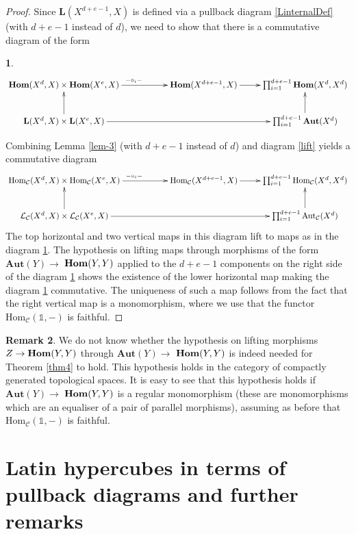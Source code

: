 \documentclass{amsart} %
\theoremstyle{plain}\newtheorem{Theorem}{Theorem}[section]
\theoremstyle{plain}\newtheorem{Conjecture}[Theorem]{Conjecture}
\theoremstyle{plain}\newtheorem{Corollary}[Theorem]{Corollary}
\theoremstyle{plain}\newtheorem{Lemma}[Theorem]{Lemma}
\theoremstyle{plain}\newtheorem{Proposition}[Theorem]{Proposition}
\theoremstyle{definition}\newtheorem{Definition}[Theorem]{Definition}
\theoremstyle{definition}\newtheorem{Example}[Theorem]{Example}
\theoremstyle{definition}\newtheorem{Examples}[Theorem]{Examples}
\theoremstyle{definition}\newtheorem{Remark}[Theorem]{Remark}
\theoremstyle{definition}\newtheorem{Remarks}[Theorem]{Remarks}
\theoremstyle{plain}\newtheorem{Statement}[Theorem]{}
\def\CC{{\mathcal{C}}}    \def\OP{{\mathcal{O}P}}
\def\CL{{\mathcal{L}}}  \def\bCL{{\mathbf{L}}}
\def\One{{\mathds{1}}}
\def\Aut{\mathrm{Aut}}   \def\bAut{\mathbf{Aut}}        \def\tenk{\otimes_k}
\def\Hom{\mathrm{Hom}}           \def\tenkS{\otimes_{kS}}
\begin{document}
\begin{proof}
Since $\bCL(X^{d+e-1},X)$ is defined via a pullback diagram \ref{LinternalDef} (with $d+e-1$
instead of $d$), we need to show that there is a commutative  diagram of the form
\begin{Statement} \label{thm4-diagram}
$$\xymatrix{\bHom(X^d,X) \times \bHom(X^e,X) \ar[rr]^{-\circ_i-} & & \bHom(X^{d+e-1},X) \ar[r]
&  \prod_{i=1}^{d+e-1}  \bHom(X^d,X^d) \\
\bCL(X^d,X) \times \bCL(X^e,X) \ar[u] \ar[rrr] & & &  \prod_{i=1}^{d+e-1}  \bAut(X^d) \ar[u] 
}$$
\end{Statement} 
Combining Lemma \ref{lem-3} (with $d+e-1$ instead of $d$) and diagram \ref{lift} yields a
commutative diagram
$$\xymatrix{\Hom_\CC(X^d,X) \times \Hom_\CC(X^e,X) \ar[rr]^{-\circ_i-} & & \Hom_\CC(X^{d+e-1},X) \ar[r]
&  \prod_{i=1}^{d+e-1}  \Hom_\CC(X^d,X^d) \\
\CL_\CC(X^d,X) \times \CL_\CC(X^e,X) \ar[u] \ar[rrr] & & &  \prod_{i=1}^{d+e-1}  \Aut_\CC(X^d) \ar[u] 
}$$
The top horizontal and two vertical maps in this diagram lift to maps as in the diagram \ref{thm4-diagram}.
The hypothesis on lifting maps through morphisms of the form $\bAut(Y)\to$ $\mathbf{Hom}(Y,Y)$
applied to the  $d+e-1$ components on the right side of the diagram \ref{thm4-diagram} shows the existence
of the lower horizontal map making the diagram \ref{thm4-diagram} commutative. The uniqueness of such a map
follows from the fact that the right vertical map is a monomorphism, where we use that the
functor $\Hom_\CC(\One,-)$ is faithful.
\end{proof}

\begin{Remark} \label{Rem-thm4} 
We do not
know whether the hypothesis on lifting morphisms $Z\to \mathbf{Hom}(Y,Y)$ through $\bAut(Y)\to$ $\mathbf{Hom}(Y,Y)$
is indeed needed for Theorem \ref{thm4} to hold. 
This hypothesis holds in the category of compactly generated topological spaces. 
It is easy to see that this hypothesis holds if $\bAut(Y) \to$ $\mathbf{Hom}(Y,Y)$  is a regular
monomorphism (these are  monomorphisms which are an equaliser of a pair of parallel morphisms),
assuming as before  that $\Hom_\CC(\One,-)$ is faithful.
\end{Remark} 


\section{Latin hypercubes in terms of pullback diagrams and further remarks} \label{pullbackSection} 
\end{document}
